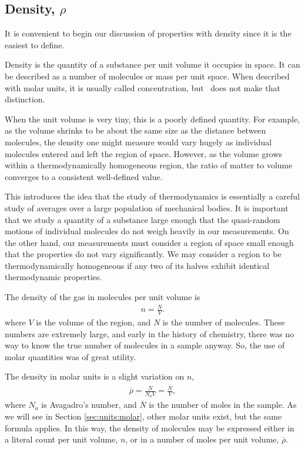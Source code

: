 \subsection{Density, $\rho$}

It is convenient to begin our discussion of properties with density since it is the easiest to define.

Density is the quantity of a substance per unit volume it occupies in space.  It can be described as a number of molecules or mass per unit space.  When described with molar units, it is usually called concentration, but \PM\ does not make that distinction.

When the unit volume is very tiny, this is a poorly defined quantity.  For example, as the volume shrinks to be about the same size as the distance between molecules, the density one might measure would vary hugely as individual molecules entered and left the region of space.  However, as the volume grows within a thermodynamically homogeneous region, the ratio of matter to volume converges to a consistent well-defined value.

This introduces the idea that the study of thermodynamics is essentially a careful study of averages over a large population of mechanical bodies.  It is important that we study a quantity of a substance large enough that the quasi-random motions of individual molecules do not weigh heavily in our measurements.  On the other hand, our measurements must consider a region of space small enough that the properties do not vary significantly.  We may consider a region to be thermodynamically homogeneous if any two of its halves exhibit identical thermodynamic properties.

The density of the gas in molecules per unit volume is
\begin{align}
n = \frac{N}{V}.
\end{align}
where $V$ is the volume of the region, and $N$ is the number of molecules.  These numbers are extremely large, and early in the history of chemistry, there was no way to know the true number of molecules in a sample anyway.  So, the use of molar quantities was of great utility.

The density in molar units is a slight variation on $n$,
\begin{align}
\overline{\rho} = \frac{N}{N_a V} = \frac{\overline{N}}{V},
\end{align}
where $N_a$ is Avagadro's number, and $\overline{N}$ is the number of moles in the sample.  As we will see in Section \ref{sec:units:molar}, other molar units exist, but the same formula applies.  In this way, the density of molecules may be expressed either in a literal count per unit volume, $n$, or in a number of moles per unit volume, $\overline{\rho}$.

